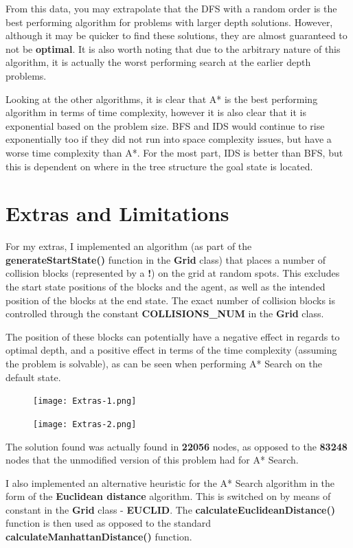 \documentclass{article}
\begin{document}
	From this data, you may extrapolate that the DFS with a random order is the best performing algorithm for problems with larger depth solutions. However, although it may be quicker to find these solutions, they are almost guaranteed to not be \textbf{optimal}. It is also worth noting that due to the arbitrary nature of this algorithm, it is actually the worst performing search at the earlier depth problems.
	
	Looking at the other algorithms, it is clear that A* is the best performing algorithm in terms of time complexity, however it is also clear that it is exponential based on the problem size. BFS and IDS would continue to rise exponentially too if they did not run into space complexity issues, but have a worse time complexity than A*. For the most part, IDS is better than BFS, but this is dependent on where in the tree structure the goal state is located.
	
	\newpage
	\section{Extras and Limitations}
	For my extras, I implemented an algorithm (as part of the \textbf{generateStartState()} function in the \textbf{Grid} class) that places a number of collision blocks (represented by a \textbf{!}) on the grid at random spots. This excludes the start state positions of the blocks and the agent, as well as the intended position of the blocks at the end state. The exact number of collision blocks is controlled through the constant \textbf{COLLISIONS\_NUM} in the \textbf{Grid} class.
	
	The position of these blocks can potentially have a negative effect in regards to optimal depth, and a positive effect in terms of the time complexity (assuming the problem is solvable), as can be seen when performing A* Search on the default state.
	\begin{figure}[h]	
		\centering
		\texttt{[image: Extras-1.png]}
	\end{figure}

	\begin{figure}[h]
		\centering
		\texttt{[image: Extras-2.png]}
	\end{figure}

	The solution found was actually found in \textbf{22056} nodes, as opposed to the \textbf{83248} nodes that the unmodified version of this problem had for A* Search.
	
	\newpage
	I also implemented an alternative heuristic for the A* Search algorithm in the form of the \textbf{Euclidean distance} algorithm. This is switched on by means of constant in the \textbf{Grid} class - \textbf{EUCLID}. The \textbf{calculateEuclideanDistance()} function is then used as opposed to the standard \textbf{calculateManhattanDistance()} function.
	
\end{document}
